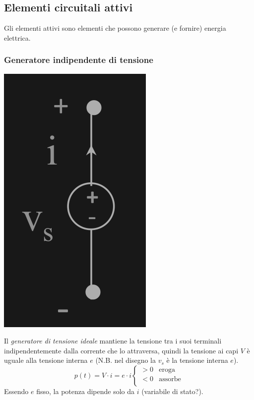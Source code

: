 \documentclass{article}
\begin{document}
\subsection{Elementi circuitali attivi}
Gli elementi attivi sono elementi che possono generare (e fornire) energia elettrica.


\subsubsection{Generatore indipendente di tensione}
\begin{center}
    \includegraphics[scale=0.23]{Image/Gen Tensione ideale.png}
\end{center}
Il \textit{generatore di tensione ideale} mantiene
la tensione tra i suoi terminali indipendentemente dalla
corrente che lo attraversa, quindi la tensione ai capi $V$ è uguale alla tensione interna $e$ (N.B. nel disegno la $v_s$ è la tensione interna $e$).
\[
    p(t) = V \cdot i = e \cdot i 
    \begin{cases}
        >0 &\text{eroga}\\
        <0 &\text{assorbe}\\
    \end{cases}
\]
Essendo $e$ fisso, la potenza dipende solo da $i$ (variabile di stato?).
\vspace*{0.2cm}\\
\end{document}
